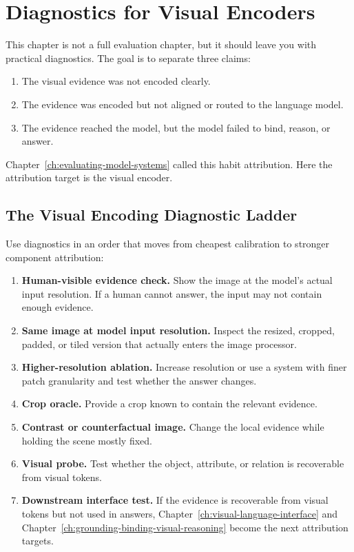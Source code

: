 \section{Diagnostics for Visual Encoders}
\label{sec:ch23-visual-encoder-diagnostics}

This chapter is not a full evaluation chapter, but it should leave you with practical diagnostics. The goal is to separate three claims:

\begin{enumerate}[nosep,leftmargin=1.5em]
  \item The visual evidence was not encoded clearly.
  \item The evidence was encoded but not aligned or routed to the language model.
  \item The evidence reached the model, but the model failed to bind, reason, or answer.
\end{enumerate}

Chapter~\ref{ch:evaluating-model-systems} called this habit attribution. Here the attribution target is the visual encoder.

\subsection{The Visual Encoding Diagnostic Ladder}

Use diagnostics in an order that moves from cheapest calibration to stronger component attribution:

\begin{enumerate}[leftmargin=1.5em]
  \item \textbf{Human-visible evidence check.} Show the image at the model's actual input resolution. If a human cannot answer, the input may not contain enough evidence.
  \item \textbf{Same image at model input resolution.} Inspect the resized, cropped, padded, or tiled version that actually enters the image processor.
  \item \textbf{Higher-resolution ablation.} Increase resolution or use a system with finer patch granularity and test whether the answer changes.
  \item \textbf{Crop oracle.} Provide a crop known to contain the relevant evidence.
  \item \textbf{Contrast or counterfactual image.} Change the local evidence while holding the scene mostly fixed.
  \item \textbf{Visual probe.} Test whether the object, attribute, or relation is recoverable from visual tokens.
  \item \textbf{Downstream interface test.} If the evidence is recoverable from visual tokens but not used in answers, Chapter~\ref{ch:visual-language-interface} and Chapter~\ref{ch:grounding-binding-visual-reasoning} become the next attribution targets.
\end{enumerate}

